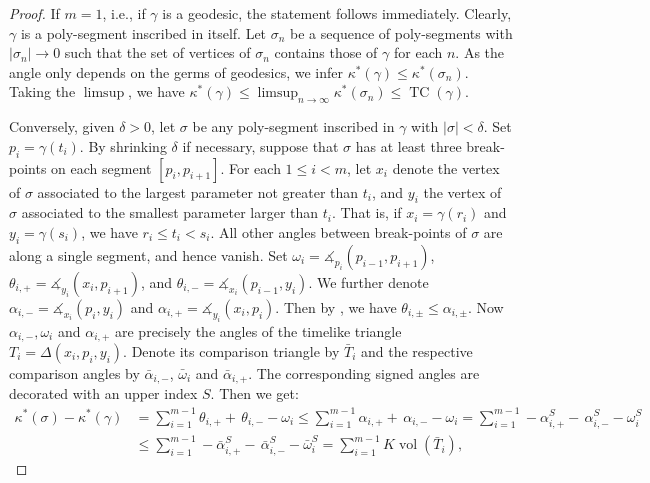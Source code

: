 \documentclass[hidelinks,12pt,a4paper]{article}
\numberwithin{equation}{section}
\theoremstyle{plain}
\theoremstyle{definition}
\DeclareMathOperator{\TC}{TC}
\DeclareMathOperator{\vol}{vol}
\newcommand{\ma}{\ensuremath{\measuredangle}}
\begin{document}
\begin{proof}
If $m=1$, i.e., if $\gamma$ is a geodesic, the statement follows immediately. 
Clearly, $\gamma$ is a poly-segment inscribed in itself. 
Let $\sigma_n$ be a sequence of poly-segments with $|\sigma_n| \to 0$ such that the set of vertices of $\sigma_n$ contains those of $\gamma$ for each $n$. 
As the angle only depends on the germs of geodesics, we infer $\kappa^*(\gamma) \leq \kappa^*(\sigma_n)$. 
Taking the $\limsup$, we have $\kappa^*(\gamma) \leq \limsup_{n \to \infty}\kappa^*(\sigma_n) \leq \TC(\gamma)$. 

Conversely, given $\delta >0$, let $\sigma$ be any poly-segment inscribed in $\gamma$ with $|\sigma|<\delta$. 
Set $p_i=\gamma(t_i)$. 
By shrinking $\delta$ if necessary, suppose that $\sigma$ has at least three break-points on each segment $[p_i,p_{i+1}]$. 
For each $1 \leq i < m$, let $x_i$ denote the vertex of $\sigma$ associated to the largest parameter not greater than $t_i$, and $y_i$ the vertex of $\sigma$ associated to the smallest parameter larger than $t_i$. 
That is, if $x_i=\gamma(r_i)$ and $y_i=\gamma(s_i)$, we have $r_i \leq t_i < s_i$. 
All other angles between break-points of $\sigma$ are along a single segment, and hence vanish. 
Set $\omega_i=\ma_{p_i}(p_{i-1},p_{i+1})$, $\theta_{i,+}=\ma_{y_i}(x_i,p_{i+1})$, and $\theta_{i,-}=\ma_{x_i}(p_{i-1},y_i)$.
We further denote $\alpha_{i,-}=\ma_{x_i}(p_i,y_i)$ and $\alpha_{i,+}=\ma_{y_i}(x_i,p_i)$. 
Then by \cite[Lemma 4.14]{BKR24}, we have $\theta_{i,\pm} \leq \alpha_{i,\pm}$. 
Now $\alpha_{i,-}, \omega_i$ and $\alpha_{i,+}$ are precisely the angles of the timelike triangle $T_i=\Delta(x_i,p_i,y_i)$. 
Denote its comparison triangle by $\bar T_i$ and the respective comparison angles by $\bar \alpha_{i,-}$, $\bar \omega_i$ and $\bar \alpha_{i,+}$. 
The corresponding signed angles are decorated with an upper index $S$.
Then we get:
\begin{align*}
\kappa^*(\sigma) - \kappa^*(\gamma) 
& = \sum_{i=1}^{m-1} \theta_{i,+} + \,\theta_{i,-} - \omega_i 
\leq  \sum_{i=1}^{m-1} \alpha_{i,+} + \,\alpha_{i,-} - \omega_i 
= \sum_{i=1}^{m-1} -\alpha_{i,+}^{S} - \,\alpha_{i,-}^{S} - \omega_i^S \\
& \leq \sum_{i=1}^{m-1} -\bar\alpha_{i,+}^{S} - \,\bar\alpha_{i,-}^{S} -\bar\omega_i^S = \sum_{i=1}^{m-1}K\vol(\bar T_i), 

\end{align*}
\end{proof}
\end{document}
